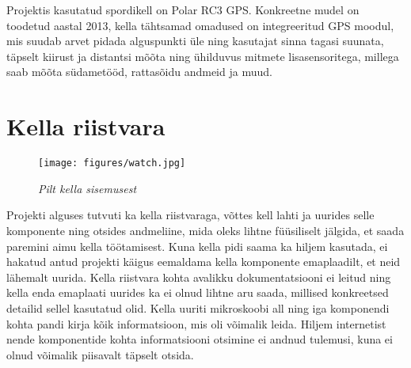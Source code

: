 


Projektis kasutatud spordikell on Polar RC3 GPS.
Konkreetne mudel on toodetud aastal 2013, kella tähtsamad omadused on integreeritud GPS moodul, mis suudab arvet pidada alguspunkti üle ning kasutajat sinna tagasi suunata, täpselt kiirust ja distantsi mõõta ning ühilduvus mitmete lisasensoritega, millega saab mõõta südametööd, rattasõidu andmeid ja muud.

\section{Kella riistvara}\label{sec:riistvara}
\begin{figure}[ht]
    \centering
    \texttt{[image: figures/watch.jpg]}
    \caption{\textit{Pilt kella sisemusest}}
    \label{fig:watch}
\end{figure}

Projekti alguses tutvuti ka kella riistvaraga, võttes kell lahti ja uurides selle komponente ning otsides andmeliine, mida oleks lihtne füüsiliselt jälgida, et saada paremini aimu kella töötamisest.
Kuna kella pidi saama ka hiljem kasutada, ei hakatud antud projekti käigus eemaldama kella komponente emaplaadilt, et neid lähemalt uurida.
Kella riistvara kohta avalikku dokumentatsiooni ei leitud ning kella enda emaplaati uurides ka ei olnud lihtne aru saada, millised konkreetsed detailid sellel kasutatud olid.
Kella uuriti mikroskoobi all ning iga komponendi kohta pandi kirja kõik informatsioon, mis oli võimalik leida.
Hiljem internetist nende komponentide kohta informatsiooni otsimine ei andnud tulemusi, kuna ei olnud võimalik piisavalt täpselt otsida.

